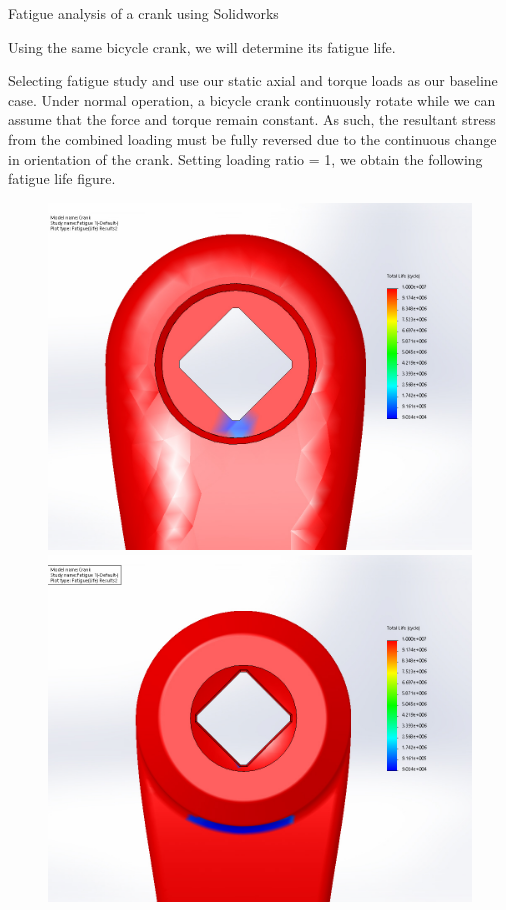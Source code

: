 \documentclass[
10pt,
a4paper,
openany,
svgnames,
]{book}
\begin{document}
\begin{example} Fatigue analysis of a crank using Solidworks

  Using the same bicycle crank, we will determine its fatigue life.

\end{example}
\begin{solution}

  Selecting fatigue study and use our static axial and torque loads as our baseline case. Under normal operation, a bicycle crank continuously rotate while we can assume that the force and torque remain constant. As such, the resultant stress from the combined loading must be fully reversed due to the continuous change in orientation of the crank. Setting loading ratio = 1, we obtain the following fatigue life figure.

\begin{figure}[H]
  \centering
  \includegraphics[scale=0.25]{pictures/Intro-CAD/Crank-fatigue-front}
  \includegraphics[scale=0.25]{pictures/Intro-CAD/Crank-fatigue-back}
\end{figure}


\end{solution}
\end{document}
